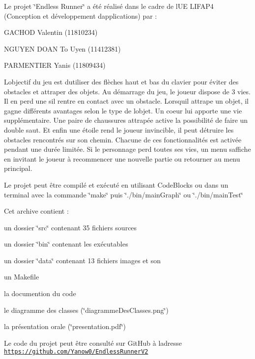 
\begin{DoxyEnumerate}
\item Le projet \char`\"{}\+Endless Runner\char`\"{} a été réalisé dans le cadre de l\textquotesingle{}UE L\+I\+F\+A\+P4 (Conception et développement d\textquotesingle{}applications) par \+:
\begin{DoxyItemize}
\item G\+A\+C\+H\+OD Valentin (11810234)
\item N\+G\+U\+Y\+EN D\+O\+AN To Uyen (11412381)
\item P\+A\+R\+M\+E\+N\+T\+I\+ER Yanis (11809434)
\end{DoxyItemize}
\item L\textquotesingle{}objectif du jeu est d\textquotesingle{}utiliser des flèches haut et bas du clavier pour éviter des obstacles et attraper des objets. Au démarrage du jeu, le joueur dispose de 3 vies. Il en perd une s\textquotesingle{}il rentre en contact avec un obstacle. Lorsqu\textquotesingle{}il attrape un objet, il gagne différents avantages selon le type de l\textquotesingle{}objet. Un coeur lui apporte une vie supplémentaire. Une paire de chaussures attrapée active la possibilité de faire un double saut. Et enfin une étoile rend le joueur invincible, il peut détruire les obstacles rencontrés sur son chemin. Chacune de ces fonctionnalités est activée pendant une durée limitée. Si le personnage perd toutes ses vies, un menu s\textquotesingle{}affiche en invitant le joueur à recommencer une nouvelle partie ou retourner au menu principal.
\item Le projet peut être compilé et exécuté en utilisant Code\+Blocks ou dans un terminal avec la commande \char`\"{}make\char`\"{} puis \char`\"{}./bin/main\+Graph\char`\"{} ou \char`\"{}./bin/main\+Test\char`\"{}
\item Cet archive contient \+:
\end{DoxyEnumerate}
\begin{DoxyItemize}
\item un dossier \char`\"{}src\char`\"{} contenant 35 fichiers sources
\item un dossier \char`\"{}bin\char`\"{} contenant les exécutables
\item un dossier \char`\"{}data\char`\"{} contenant 13 fichiers images et son
\item un Makefile
\item la documention du code
\item le diagramme des classes (\char`\"{}diagramme\+Des\+Classes.\+png\char`\"{})
\item la présentation orale (\char`\"{}presentation.\+pdf\char`\"{})
\end{DoxyItemize}
\begin{DoxyEnumerate}
\item Le code du projet peut être consulté sur Git\+Hub à l\textquotesingle{}adresse \href{https://github.com/Yanow0/EndlessRunnerV2}{\tt https\+://github.\+com/\+Yanow0/\+Endless\+Runner\+V2} 
\end{DoxyEnumerate}